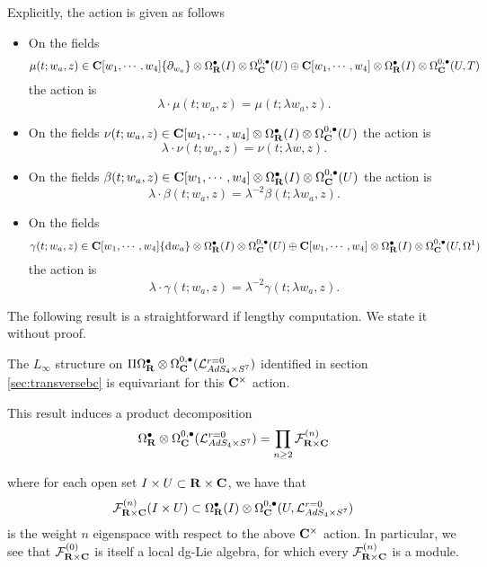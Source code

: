 \documentclass[../main.tex]{subfiles}
\begin{document}
Explicitly, the action is given as follows 
\begin{itemize}
\item On the fields 
\[
\mu(t; w_a,z) \in \mathbf{C}[w_1, \cdots, w_4]\{\partial_{w_a}\} \otimes \Omega^\bullet_{\mathbf{R}}(I) \otimes \Omega^{0,\bullet}_{\mathbf{C}} (U) \oplus \mathbf{C}[w_1, \cdots, w_4]\otimes \Omega^\bullet_{\mathbf{R}}(I)\otimes \Omega^{0,\bullet}_{\mathbf{C}}(U, T)\] 
the action is
\[
\lambda \cdot \mu(t; w_a,z) = \mu(t; \lambda w_a , z).
\]
\item On the fields $\nu(t; w_a,z) \in \mathbf{C}[w_1, \cdots, w_4] \otimes \Omega^{\bullet}_{\mathbf{R}}(I) \otimes \Omega^{0,\bullet}_{\mathbf{C}}(U)$ the action is
\[
\lambda \cdot \nu(t; w_a,z) = \nu(t; \lambda w , z).
\]
\item On the fields $\beta(t; w_a,z) \in  \mathbf{C}[w_1, \cdots, w_4] \otimes \Omega^{\bullet}_{\mathbf{R}}(I) \otimes \Omega^{0,\bullet}_{\mathbf{C}}(U)$ the action is
\[
\lambda \cdot \beta(t; w_a,z) = \lambda^{-2} \beta(t; \lambda w_a , z).
\]
\item On the fields 
\[
\gamma(t; w_a,z) \in  \mathbf{C}[w_1, \cdots, w_4] \{\mathrm{d} w_a\} \otimes \Omega^{\bullet}_{\mathbf{R}}(I) \otimes\Omega^{0,\bullet}_{\mathbf{C}} (U) \oplus  \mathbf{C}[w_1, \cdots, w_4] \otimes \Omega^{\bullet}_{\mathbf{R}}(I) \otimes\Omega^{0,\bullet}_{\mathbf{C}}(U, \Omega^1)
\] 
the action is
\[
\lambda \cdot \gamma(t; w_a,z) = \lambda^{-2} \gamma(t; \lambda w _a, z).
\]
\end{itemize}

The following result is a straightforward if lengthy computation. We state it without proof.

\begin{prop}\label{prop:ads4decomp}
The $L_\infty$ structure on $\Pi\Omega^\bullet_{\mathbf{R}}\otimes \Omega^{0,\bullet}_{\mathbf{C}} (\mathcal{L}^{r=0}_{AdS_4\times S^7} )$ identified in section \ref{sec:transversebc} is equivariant for this $\mathbf{C}^\times$ action.
\end{prop}

This result induces a product decomposition 
\[
\Omega^\bullet_{\mathbf{R}}\otimes \Omega^{0,\bullet}_{\mathbf{C}} (\mathcal{L}^{r=0}_{AdS_4\times S^7} ) = \prod _{n\geq 2} \mathcal{F}^{(n)}_{\mathbf{R}\times \mathbf{C}}
\]

where for each open set $I\times U\subset\mathbf{R}\times \mathbf{C}$, we have that \[\mathcal{F}_{\mathbf{R}\times \mathbf{C}}^{(n)} (I\times U) \subset \Omega^\bullet_{\mathbf{R}} (I) \otimes \Omega^{0,\bullet}_{\mathbf{C}} (U, \mathcal{L}^{r=0}_{AdS_4\times S^7} )\] is the weight $n$ eigenspace with respect to the above $\mathbf{C}^\times$ action. In particular, we see that $\mathcal{F}^{(0)}_{\mathbf{R}\times \mathbf{C}}$ is itself a local dg-Lie algebra, for which  every $\mathcal{F}^{(n)}_{\mathbf{R}\times \mathbf{C}}$ is a module.
\end{document}

